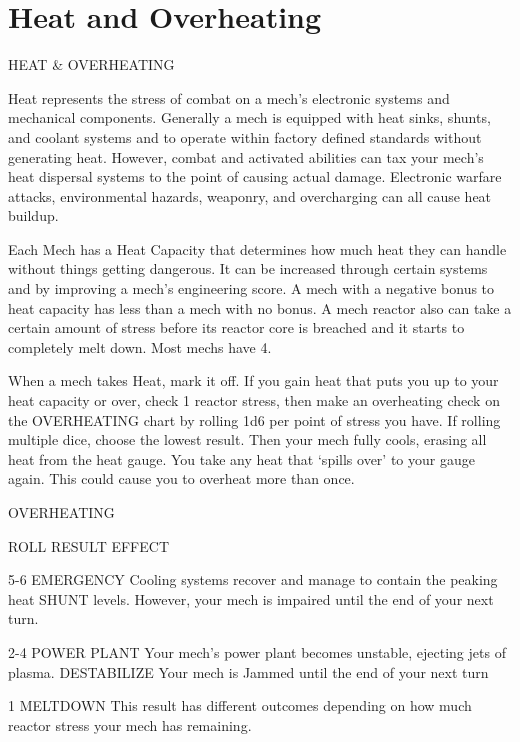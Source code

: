 \section{Heat and Overheating}

  HEAT \& OVERHEATING  

Heat represents the stress of combat on a mech’s electronic systems and mechanical  
components. Generally a mech is equipped with heat sinks, shunts, and coolant systems and to  
operate within factory defined standards without generating heat. However, combat and  
activated abilities can tax your mech’s heat dispersal systems to the point of causing actual  
damage. Electronic warfare attacks, environmental hazards, weaponry, and overcharging can all  
cause heat buildup.
 

Each Mech has a Heat Capacity that determines how much heat they can handle without things  
getting dangerous. It can be increased through certain systems and by improving a mech’s  
engineering score. A mech with a negative bonus to heat capacity has less than a mech with no  
bonus. A mech reactor also can take a certain amount of stress before its reactor core is  
breached and it starts to completely melt down. Most mechs have 4.
 

When a mech takes Heat, mark it off. If you gain heat that puts you up to your heat capacity or  
over, check 1 reactor stress, then make an overheating check on the OVERHEATING chart by  
rolling 1d6 per point of stress you have. If rolling multiple dice, choose the lowest result. Then  
your mech fully cools, erasing all heat from the heat gauge. You take any heat that ‘spills over’ to  
your gauge again. This could cause you to overheat more than once.
 

                                                OVERHEATING
 

 ROLL       RESULT                  EFFECT 

 5-6        EMERGENCY               Cooling systems recover and manage to contain the peaking heat  
            SHUNT                   levels. However, your mech is impaired until the end of your next turn. 

 2-4        POWER PLANT             Your mech’s power plant becomes unstable, ejecting jets of plasma.  
            DESTABILIZE             Your mech is Jammed until the end of your next turn 

 1          MELTDOWN                This result has different outcomes depending on how much reactor  
                                    stress your mech has remaining.
 
